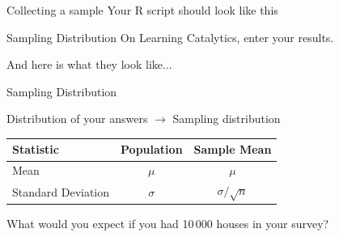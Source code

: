 \documentclass{beamer}\usepackage[]{graphicx}\usepackage[]{color}
\begin{document}
\begin{darkframes}
{\begin{lstlisting}[language=R,tabsize=2]
    \end{lstlisting}}	
    
    \begin{frame}[label=lists]{Collecting a sample}
    Your R script should look like this
    \sampleZillow
    
    \end{frame}


    \begin{frame}[label=lists]{Sampling Distribution} 
		On Learning Catalytics, enter your results. \newline
		
		And here is what they look like... %
    \end{frame}



    \begin{frame}[label=lists]{Sampling Distribution}
    	
		Distribution of your answers  $\rightarrow$ \alert{Sampling distribution} \newline 
		    	
    
    	
		\begin{table}[!b]
        {\carlitoTLF %
        \begin{tabularx}{\textwidth}{Xcc}
          \textbf{Statistic} & \textbf{Population} & \textbf{Sample Mean} \\
          \toprule
          Mean       		& $\mu$  & $\mu$  \\
          Standard Deviation          & $\sigma$     & $\sigma/\sqrt{n}$ \\
          \bottomrule
        \end{tabularx}}
        
      \end{table}    	
      \quad \newline
      What would you expect if you had 10\,000 houses in your survey?
    	

\end{frame}
\end{darkframes}
\end{document}
